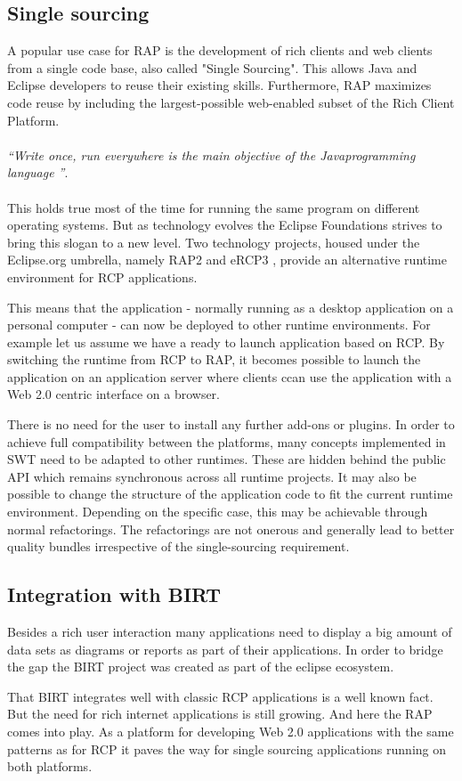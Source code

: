 \subsection{Single sourcing}
A popular use case for RAP is the development of rich clients and web clients
from a single code base, also called "Single Sourcing". This allows Java and
Eclipse developers to reuse their existing skills. Furthermore, RAP maximizes
code reuse by including the largest-possible web-enabled subset of the Rich
Client Platform.
\\
\\
\emph{``Write once, run everywhere is the main objective of the
Java\texttrademark programming language ''}\cite{programming:java:spec}.
\\
\\
This holds true most of the time for running the same program on different
operating systems. But as technology evolves the Eclipse Foundations strives to
bring this slogan to a new level. Two technology projects, housed under the
Eclipse.org umbrella, namely RAP2 and eRCP3 , provide an alternative runtime
environment for RCP applications.

This means that the application - normally running as a desktop application on a
personal computer - can now be deployed to other runtime environments. For
example let us assume we have a ready to launch application based on RCP. By
switching the runtime from RCP to RAP, it becomes possible to launch the
application on an application server where clients ccan use the application with
a Web 2.0 centric interface on a browser.

There is no need for the user to install any further add-ons or plugins. In order
to achieve full compatibility between the platforms, many concepts implemented in
SWT \cite{eclipse:swt:wtoolkit} need to be adapted to other runtimes. These are
hidden behind the public API which remains synchronous across all runtime
projects. It may also be possible to change the structure of the application code
to fit the current runtime environment. Depending on the specific case, this may
be achievable through normal refactorings. The refactorings are not onerous and
generally lead to better quality bundles irrespective of the single-sourcing
requirement.

\subsection{Integration with BIRT}
\label{chap:RAP}
Besides a rich user interaction many applications need to display a big amount of
data sets as diagrams or reports as part of their applications. In order to
bridge the gap the BIRT project was created as part of the eclipse ecosystem.

That BIRT integrates well with classic RCP applications is a well known fact. But
the need for rich internet applications is still growing. And here the RAP comes
into play. As a platform for developing Web 2.0 applications with the same
patterns as for RCP it paves the way for single sourcing applications running on
both platforms.
